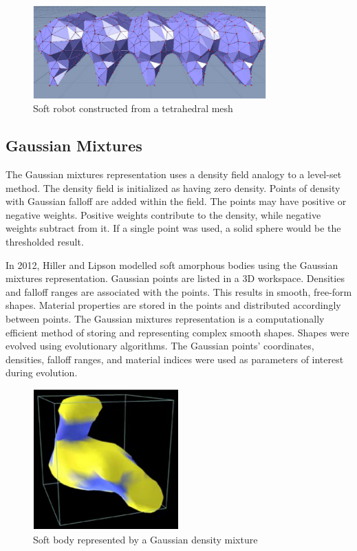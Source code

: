 \begin{figure}[H]
	\centering
	\includegraphics[width=0.8\textwidth]{Mesh.png}
	\caption[Soft robot constructed from tetrahedral mesh]{Soft robot constructed from a tetrahedral mesh \citep{Rieffel2013}}
	\label{fig:mesh}
\end{figure}

\subsection{Gaussian Mixtures}

The Gaussian mixtures representation \citep{Pernkopf2005} uses a density field analogy to a level-set method. The density field is initialized as having zero density. Points of density with Gaussian falloff are added within the field. The points may have positive or negative weights. Positive weights contribute to the density, while negative weights subtract from it. If a single point was used, a solid sphere would be the thresholded result. \citep{Hiller2012}

In 2012, Hiller and Lipson modelled soft amorphous bodies using the Gaussian mixtures representation. Gaussian points are listed in a 3D workspace. Densities and falloff ranges are associated with the points. This results in smooth, free-form shapes. Material properties are stored in the points and distributed accordingly between points. The Gaussian mixtures representation is a computationally efficient method of storing and representing complex smooth shapes. Shapes were evolved using evolutionary algorithms. The Gaussian points' coordinates, densities, falloff ranges, and material indices were used as parameters of interest during evolution. \citep{Hiller2012}

\begin{figure}[H]
	\centering
	\includegraphics[width=0.5\textwidth]{Gauss.png}
	\caption[Soft body represented by Gaussian density mixture]{Soft body represented by a Gaussian density mixture \citep{Hiller2012}}
	\label{fig:gauss}
\end{figure}

